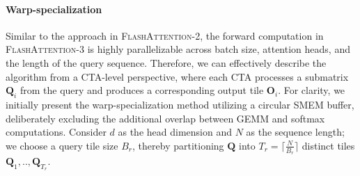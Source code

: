 \paragraph{Warp-specialization}
Similar to the approach in \textsc{FlashAttention-2}, the forward computation in \textsc{FlashAttention-3} is highly parallelizable across batch size, attention heads, and the length of the query sequence. Therefore, we can effectively describe the algorithm from a CTA-level perspective, where each CTA processes a submatrix $\mathbf{Q}_i$ from the query and produces a corresponding output tile $\mathbf{O}_i$. For clarity, we initially present the warp-specialization method utilizing a circular SMEM buffer, deliberately excluding the additional overlap between GEMM and softmax computations. Consider $d$ as the head dimension and $N$ as the sequence length; we choose a query tile size $B_r$, thereby partitioning $\mathbf{Q}$ into $T_r = \lceil \frac{N}{B_r} \rceil$ distinct tiles $\mathbf{Q}_1, .., \mathbf{Q}_{T_r}$.

